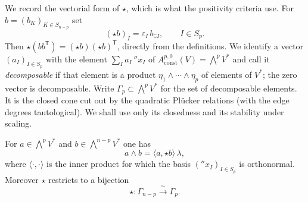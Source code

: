We record the vectorial form of $\star$, which is what the positivity
criteria use.  For $b=(b_K)_{K\in S_{n-p}}$ set
\[
 (\star b)_I=\varepsilon_I\,b_{\complement I},\qquad I\in S_p .
\]
Then $\star(bb^{\mathsf T})=(\star b)(\star b)^{\mathsf T}$, directly from the
definitions.  We identify a vector $(a_I)_{I\in S_p}$ with the element
$\sum_Ia_I\,\dprime x_I$ of
$A_{\mathrm{const}}^{p,0}(V)=\bigwedge^pV^*$ and call it
\emph{decomposable} if that element is a product
$\eta_1\wedge\cdots\wedge\eta_p$ of elements of $V^*$; the zero vector is
decomposable.  Write $\Gamma_p\subset\bigwedge^pV^*$ for the set of
decomposable elements.  It is the closed cone cut out by the quadratic
Pl\"ucker relations (with the edge degrees tautological).  We shall use only
its closedness and its stability under scaling.

\begin{lemma}
\label{lem:ch09-star-decomposable}
For $a\in\bigwedge^pV^*$ and $b\in\bigwedge^{n-p}V^*$ one has
\[
 a\wedge b=\langle a,\star b\rangle\,\lambda,
\]
where $\langle\cdot,\cdot\rangle$ is the inner product for which the basis
$(\dprime x_I)_{I\in S_p}$ is orthonormal.  Moreover $\star$ restricts to a
bijection
\[
 \star:\Gamma_{n-p}\xrightarrow{\ \sim\ }\Gamma_p .
\]
\end{lemma}

